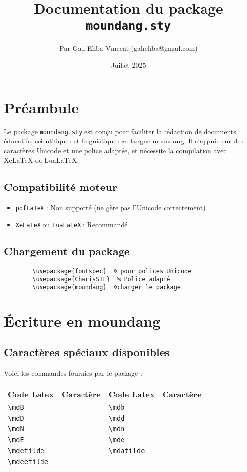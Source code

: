 \documentclass[a4paper,12pt]{article}
\title{\textbf{Documentation du package \verb|moundang.sty|}}
\author{Par Gali Ehba Vincent (galiehba@gmail.com)}
\date{Juillet 2025}
\begin{document}
	
	\maketitle
	\newpage
	\tableofcontents
	\newpage
	\section{Préambule}
	Le package \texttt{moundang.sty} est conçu pour faciliter la rédaction de documents éducatifs, scientifiques et linguistiques en langue moundang. Il s'appuie sur des caractères Unicode et une police adaptée, et nécessite la compilation avec XeLaTeX ou LuaLaTeX.
	
	\subsection*{Compatibilité moteur}
	\begin{itemize}
		\item \texttt{pdfLaTeX} : Non supporté (ne gère pas l'Unicode correctement)
		\item \texttt{XeLaTeX} ou \texttt{LuaLaTeX} : Recommandé
	\end{itemize}
	
	\subsection*{Chargement du package}
	\begin{verbatim}
		\usepackage{fontspec}  % pour polices Unicode
		\usepackage{CharisSIL}  % Police adapté
		\usepackage{moundang}  %charger le package
	\end{verbatim}
	
	\section{Écriture en moundang}
	\subsection{Caractères spéciaux disponibles}
	Voici les commandes fournies par le package :
	
	\begin{tabular}{|l|l|l|l|}
		\hline
		Code Latex & Caractère & Code Latex & Caractère\\
		\hline
		\verb*|\mdB| & \mdB & \verb*|\mdb| & \mdb\\
		\hline
		\verb*|\mdD| & \mdD & \verb*|\mdd| & \mdd\\
		\hline
		\verb*|\mdN| & \mdN & \verb*|\mdn| & \mdn\\
		\hline
		\verb*|\mdE| & \mdE & \verb*|\mde| & \mde\\
		\hline
		\verb*|\mdetilde| & \mdetilde & \verb*|\mdatilde| & \mdatilde\\
		\hline
		\verb*|\mdeetilde| & \mdeetilde & &\\
		\hline
	\end{tabular}
	
\end{document}
